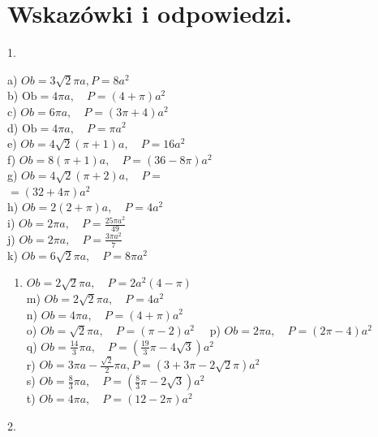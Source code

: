 \documentclass[10pt]{article}
\begin{document}
\section*{Wskazówki i odpowiedzi.}
1.

a) \(O b=3 \sqrt{2} \pi a, P=8 a^{2}\)\\
b) \(\mathrm{Ob}=4 \pi a, \quad P=(4+\pi) a^{2}\)\\
c) \(O b=6 \pi a, \quad P=(3 \pi+4) a^{2}\)\\
d) \(\mathrm{Ob}=4 \pi a, \quad P=\pi a^{2}\)\\
e) \(O b=4 \sqrt{2}(\pi+1) a, \quad P=16 a^{2}\)\\
f) \(O b=8(\pi+1) a, \quad P=(36-8 \pi) a^{2}\)\\
g) \(O b=4 \sqrt{2}(\pi+2) a, \quad P=\)\\
\(=(32+4 \pi) a^{2}\)\\
h) \(O b=2(2+\pi) a, \quad P=4 a^{2}\)\\
i) \(O b=2 \pi a, \quad P=\frac{25 \pi a^{2}}{49}\)\\
j) \(O b=2 \pi a, \quad P=\frac{3 \pi a^{2}}{7}\)\\
k) \(O b=6 \sqrt{2} \pi a, \quad P=8 \pi a^{2}\)

\begin{enumerate}
  \item \(O b=2 \sqrt{2} \pi a, \quad P=2 a^{2}(4-\pi)\)\\
m) \(O b=2 \sqrt{2} \pi a, \quad P=4 a^{2}\)\\
n) \(O b=4 \pi a, \quad P=(4+\pi) a^{2}\)\\
o) \(O b=\sqrt{2} \pi a, \quad P=(\pi-2) a^{2} \quad\) p) \(O b=2 \pi a, \quad P=(2 \pi-4) a^{2}\)\\
q) \(O b=\frac{14}{3} \pi a, \quad P=\left(\frac{19}{3} \pi-4 \sqrt{3}\right) a^{2}\)\\
r) \(O b=3 \pi a-\frac{\sqrt{2}}{2} \pi a, P=(3+3 \pi-2 \sqrt{2} \pi) a^{2}\)\\
s) \(O b=\frac{8}{3} \pi a, \quad P=\left(\frac{8}{3} \pi-2 \sqrt{3}\right) a^{2}\)\\
t) \(O b=4 \pi a, \quad P=(12-2 \pi) a^{2}\)
\end{enumerate}

2.
\end{document}
